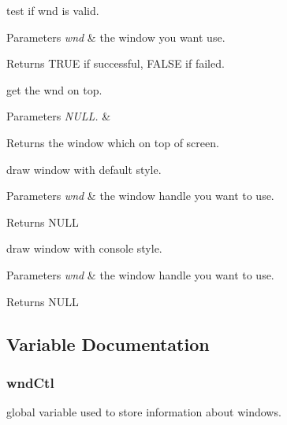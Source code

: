 test if wnd is valid. 
\begin{DoxyParams}{Parameters}
{\em wnd} & the window you want use. \\
\hline
\end{DoxyParams}
\begin{DoxyReturn}{Returns}
T\+R\+U\+E if successful, F\+A\+L\+S\+E if failed.
\end{DoxyReturn}
get the wnd on top. 
\begin{DoxyParams}{Parameters}
{\em N\+U\+L\+L.} & \\
\hline
\end{DoxyParams}
\begin{DoxyReturn}{Returns}
the window which on top of screen.
\end{DoxyReturn}
draw window with default style. 
\begin{DoxyParams}{Parameters}
{\em wnd} & the window handle you want to use. \\
\hline
\end{DoxyParams}
\begin{DoxyReturn}{Returns}
N\+U\+L\+L
\end{DoxyReturn}
draw window with console style. 
\begin{DoxyParams}{Parameters}
{\em wnd} & the window handle you want to use. \\
\hline
\end{DoxyParams}
\begin{DoxyReturn}{Returns}
N\+U\+L\+L
\end{DoxyReturn}


\subsection{Variable Documentation}
\hypertarget{group__windows_ga09cb97df9687e1ed6c1d124cb94ed6d5}{}
\subsubsection[{wnd\+Ctl}]{ wnd\+Ctl}\label{group__windows_ga09cb97df9687e1ed6c1d124cb94ed6d5}


global variable used to store information about windows. 

